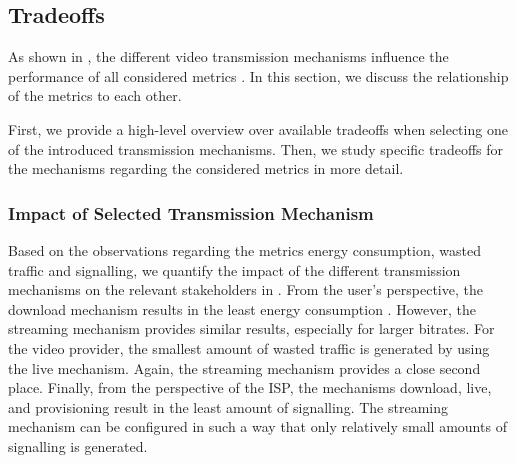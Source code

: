 \subsection{Tradeoffs}\label{sec:application:lte_video:trade_offs}
As shown in , the different video transmission mechanisms influence the performance of all considered metrics . 
In this section, we discuss the relationship of the metrics to each other.

First, we provide a high-level overview over available tradeoffs when selecting one of the introduced transmission mechanisms.
Then, we study specific tradeoffs for the \streaming mechanisms regarding the considered metrics in more detail.

\subsubsection*{Impact of Selected Transmission Mechanism}\label{sec:application:lte_video:trade_offs:mechanism_selection}

Based on the observations regarding the metrics energy consumption, wasted traffic and signalling, we quantify the impact of the different transmission mechanisms on the relevant stakeholders in .
From the user's perspective, the download mechanism results in the least energy consumption \energyconsumption.
However, the streaming mechanism provides similar results, especially for larger bitrates.
For the video provider, the smallest amount of wasted traffic is generated by using the live mechanism.
Again, the streaming mechanism provides a close second place.
Finally, from the perspective of the \gls{ISP}, the mechanisms download, live, and provisioning result in the least amount of signalling.
The streaming mechanism can be configured in such a way that only relatively small amounts of signalling is generated.

